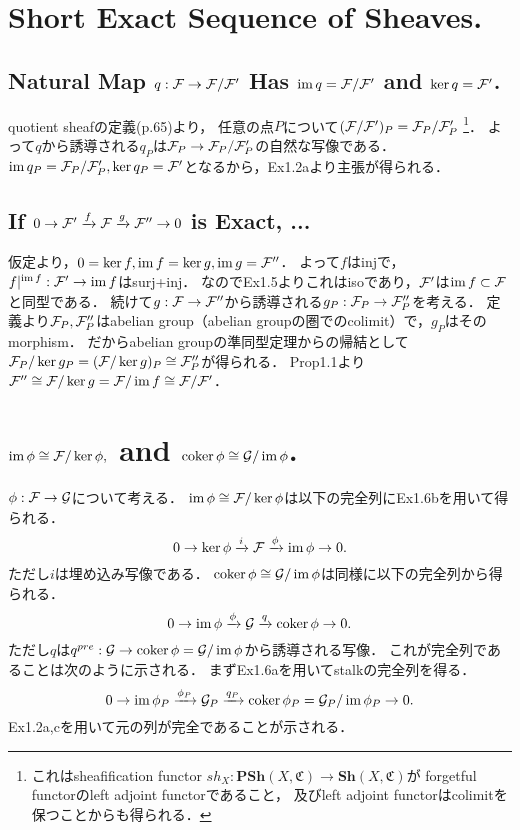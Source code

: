 \documentclass[a4paper]{jsarticle}
\begin{document}
\section{Short Exact Sequence of Sheaves.} %
    \subsection{Natural Map $q:\mathcal{F} \to \mathcal{F}/\mathcal{F}'$ Has $\operatorname{im} q=\mathcal{F}/\mathcal{F}'$ and $\ker q=\mathcal{F}'$.}
    quotient sheafの定義(p.65)より，
    任意の点$P$について$(\mathcal{F}/\mathcal{F}')_P=\mathcal{F}_P/\mathcal{F}'_P$
    \footnote
    {
        これはsheafification functor $sh_X: \mathbf{PSh}(X, \mathfrak{C}) \to \mathbf{Sh}(X, \mathfrak{C})$が
        forgetful functorのleft adjoint functorであること，
        及びleft adjoint functorはcolimitを保つことからも得られる．
    }．
    よって$q$から誘導される$q_P$は$\mathcal{F}_P \to \mathcal{F}_P/\mathcal{F}'_P$の自然な写像である．
    $\operatorname{im} q_P=\mathcal{F}_P/\mathcal{F}'_P, \ker q_P=\mathcal{F}'$となるから，Ex1.2aより主張が得られる．

    \subsection{If $0 \to \mathcal{F}' \xrightarrow{f} \mathcal{F} \xrightarrow{g} \mathcal{F}'' \to 0$ is Exact, ...}
    仮定より，$0=\ker f, \operatorname{im} f=\ker g, \operatorname{im} g=\mathcal{F}''$．
    よって$f$はinjで，$f|^{\operatorname{im} f}: \mathcal{F}' \to \operatorname{im} f$はsurj+inj．
    なのでEx1.5よりこれはisoであり，$\mathcal{F}'$は$\operatorname{im} f \subset \mathcal{F}$と同型である．
    続けて$g:\mathcal{F} \to \mathcal{F}''$から誘導される$g_P: \mathcal{F}_P \to \mathcal{F}''_P$を考える．
    定義より$\mathcal{F}_P, \mathcal{F}''_P$はabelian group（abelian groupの圏でのcolimit）で，$g_P$はそのmorphism．
    だからabelian groupの準同型定理からの帰結として$\mathcal{F}_P/\ker g_P=(\mathcal{F}/\ker g)_P \cong \mathcal{F}''_P$が得られる．
    Prop1.1より$\mathcal{F}'' \cong \mathcal{F}/\ker g=\mathcal{F}/\operatorname{im} f \cong \mathcal{F}/\mathcal{F}'$．

\section{$\operatorname{im} \phi \cong \mathcal{F}/\ker \phi,$ and $\operatorname{coker} \phi \cong \mathcal{G}/\operatorname{im} \phi$.} %
    $\phi: \mathcal{F} \to \mathcal{G}$について考える．
    $\operatorname{im} \phi \cong \mathcal{F}/\ker \phi$は以下の完全列にEx1.6bを用いて得られる．
    \[ 0 \to \ker \phi \xrightarrow{i} \mathcal{F} \xrightarrow{\phi} \operatorname{im} \phi \to 0. \]
    ただし$i$は埋め込み写像である．
    $\operatorname{coker} \phi \cong \mathcal{G}/\operatorname{im} \phi$は同様に以下の完全列から得られる．
    \[ 0 \to \operatorname{im} \phi \xrightarrow{\phi} \mathcal{G} \xrightarrow{q} \operatorname{coker} \phi \to 0. \]
    ただし$q$は$q^{pre}: \mathcal{G} \to \operatorname{coker} \phi=\mathcal{G}/\operatorname{im} \phi$から誘導される写像．
    これが完全列であることは次のように示される．
    まずEx1.6aを用いてstalkの完全列を得る．
    \[ 0 \to \operatorname{im} \phi_P \xrightarrow{\phi_P} \mathcal{G}_P \xrightarrow{q_P} \operatorname{coker} \phi_P=\mathcal{G}_P/\operatorname{im} \phi_P \to 0. \]
    Ex1.2a,cを用いて元の列が完全であることが示される．
\end{document}
